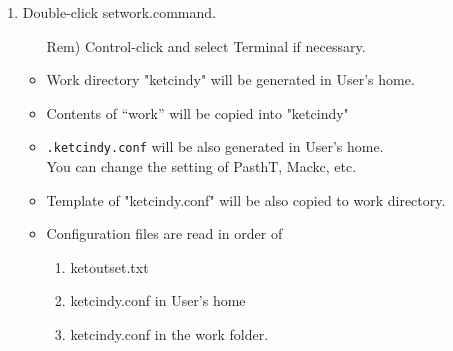 \documentclass{article}
\begin{document}
\begin{enumerate}[\bf\large 1.]
\begin{enumerate}[(1)]
    \item Double-click setwork.command.
    \begin{itemize}
    \item[Rem)]Control-click and select Terminal if necessary. 
    \end{itemize}
    \begin{itemize}
    \item Work directory "ketcindy" will be generated in User's home.
    \item Contents of “work” will be copied into "ketcindy"
    \item \verb|.ketcindy.conf| will be also generated in User's home.\\
    \hspace*{10mm}You can change the setting of PasthT, Mackc, etc.
    \item Template of "ketcindy.conf" will be also copied to work directory.
    \item Configuration files are read in order of 
      \begin{enumerate}[1)]
      \item ketoutset.txt
      \item ketcindy.conf in User's home
      \item ketcindy.conf in the work folder.
      \end{enumerate}
    \end{itemize}
  \end{enumerate}


\end{enumerate}
\end{document}
